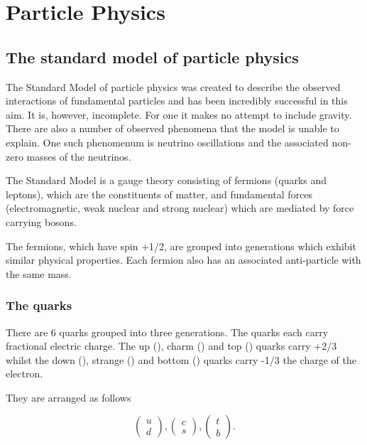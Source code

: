\chapter{Particle Physics}
\label{chap:particle-physics}

\section{The standard model of particle physics}

The Standard Model of particle physics was created to describe the observed interactions of fundamental particles and has been incredibly successful in this aim. It is, however, incomplete. For one it makes no attempt to include gravity. There are also a number of observed phenomena that the model is unable to explain. One such phenomenum is neutrino oscillations and the associated non-zero masses of the neutrinos. 

The Standard Model is a   \CrossProduct {} gauge theory consisting of fermions (quarks and leptons), which are the constituents of matter, and fundamental forces (electromagnetic, weak nuclear and strong nuclear) which are mediated by force carrying bosons.

The fermions, which have spin +1/2, are grouped into generations which exhibit similar physical properties. Each fermion also has an associated anti-particle with the same mass. 



\subsection{The quarks}

There are 6 quarks grouped into three generations. The quarks each carry fractional electric charge. The up (\Pup), charm (\Pcharm) and top (\Ptop) quarks carry +2/3 whilst the down (\Pdown), strange (\Pstrange) and bottom (\Pbottom) quarks carry -1/3 the charge of the electron.

They are arranged as follows

\begin{equation}
  \begin{pmatrix}
    u \\
    d
  \end{pmatrix}
  ,
  \begin{pmatrix}
    c \\
    s
  \end{pmatrix}
  ,
  \begin{pmatrix}
    t \\
    b
  \end{pmatrix}
.
\end{equation}

